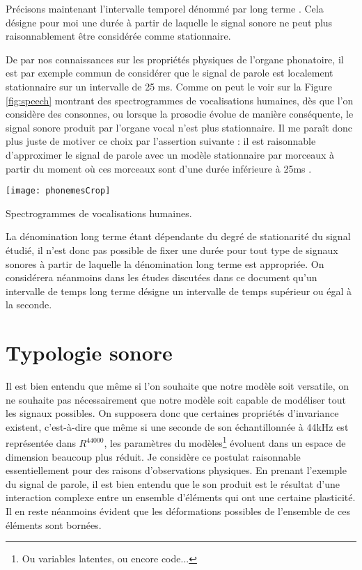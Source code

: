 Précisons maintenant l'intervalle temporel dénommé par \og long terme \fg. Cela désigne pour moi une durée à partir de laquelle le signal sonore ne peut plus raisonnablement être considérée comme stationnaire.

De par nos connaissances sur les propriétés physiques de l'organe phonatoire, il est par exemple commun de considérer que le signal de parole est localement stationnaire sur un intervalle de 25 ms. Comme on peut le voir sur la Figure \ref{fig:speech} montrant des spectrogrammes de vocalisations humaines\cite{ladefoged2014course}, dès que l'on considère des consonnes, ou lorsque la prosodie évolue de manière conséquente, le signal sonore produit par l'organe vocal n'est plus stationnaire. Il me paraît donc plus juste de motiver ce choix par l'assertion suivante : \og il est raisonnable d'approximer le signal de parole avec un modèle stationnaire par morceaux à partir du moment où ces morceaux sont d'une durée inférieure à 25ms \fg.

\begin{marginfigure}
  \texttt{[image: phonemesCrop]}
  \caption{Spectrogrammes de vocalisations humaines.} %
\end{marginfigure}

La dénomination \og long terme \fg  étant dépendante du degré de stationarité du signal étudié, il n'est donc pas possible de fixer une durée pour tout type de signaux sonores à partir de laquelle la dénomination \og long terme \fg est appropriée. On considérera néanmoins dans les études discutées dans ce document qu'un intervalle de temps  \og long terme \fg désigne un intervalle de temps supérieur ou égal à la seconde.

\section{ \nmu Typologie sonore} \label{sec:typologie}

Il est bien entendu que même si l'on souhaite que notre modèle soit versatile, on ne souhaite pas nécessairement que notre modèle soit capable de modéliser tout les signaux possibles. On supposera donc que certaines propriétés d'invariance existent, c'est-à-dire que même si une seconde de son échantillonnée à 44kHz est représentée dans $R^{44000}$, les paramètres du modèles\footnote{Ou variables latentes, ou encore code...} évoluent dans un espace de dimension beaucoup plus réduit. Je considère ce postulat raisonnable essentiellement pour des raisons d'observations physiques. En prenant l'exemple du signal de parole, il est bien entendu que le son produit est le résultat d'une interaction complexe entre un ensemble d'éléments qui ont une certaine plasticité. Il en reste néanmoins évident que les déformations possibles de l'ensemble de ces éléments sont bornées.

